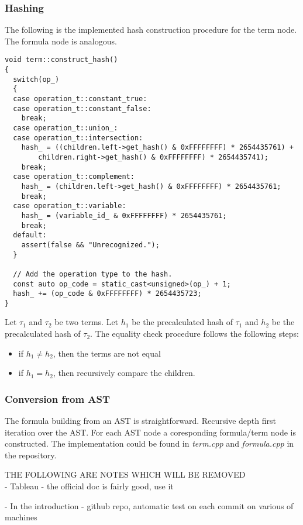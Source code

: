 \documentclass{article}
\begin{document}
	\subsubsection{Hashing}
	The following is the implemented hash construction procedure for the term node. The formula node is analogous.
\begin{lstlisting}
void term::construct_hash()
{
  switch(op_)
  {
  case operation_t::constant_true:
  case operation_t::constant_false:
    break;
  case operation_t::union_:
  case operation_t::intersection:
    hash_ = ((children.left->get_hash() & 0xFFFFFFFF) * 2654435761) +
        children.right->get_hash() & 0xFFFFFFFF) * 2654435741);
    break;
  case operation_t::complement:
    hash_ = (children.left->get_hash() & 0xFFFFFFFF) * 2654435761;
    break;
  case operation_t::variable:
    hash_ = (variable_id_ & 0xFFFFFFFF) * 2654435761;
    break;
  default:
    assert(false && "Unrecognized.");
  }

  // Add the operation type to the hash.
  const auto op_code = static_cast<unsigned>(op_) + 1;
  hash_ += (op_code & 0xFFFFFFFF) * 2654435723;
}
\end{lstlisting}

	Let $\tau_1$ and $\tau_2$ be two terms. Let $h_1$ be the precalculated hash of $\tau_1$ and $h_2$ be the precalculated hash of $\tau_2$.
	The equality check procedure follows the following steps:
	\begin{itemize}
		\item if $h_1 \neq h_2$, then the terms are not equal
		\item if $h_1 = h_2$, then recursively compare the children.
	\end{itemize}
	\noindent

	\newpage
	\subsubsection{Conversion from AST}
	The formula building from an AST is straightforward. Recursive depth first iteration over the AST. For each AST node a coresponding formula/term node is constructed. The implementation could be found in \textit{term.cpp} and \textit{formula.cpp} in the repository.

	\newpage
	THE FOLLOWING ARE NOTES WHICH WILL BE REMOVED \\

	- Tableau - the official doc is fairly good, use it

    - In the introduction - github repo, automatic test on each commit on various of machines
\end{document}
